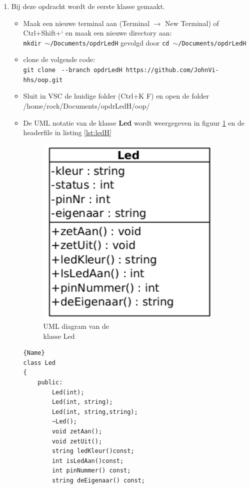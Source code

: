 \begin{enumerate}
\item Bij deze opdracht wordt de eerste klasse gemaakt.
\begin{itemize}
	\item Maak een nieuwe terminal aan (Terminal $\rightarrow$ New Terminal) of Ctrl+Shift+` en maak een nieuwe directory aan:\\ \texttt{mkdir $\sim$/Documents/opdrLedH} gevolgd door \texttt{cd $\sim$/Documents/opdrLedH}
	\item clone de volgende code:\\
	 {\small \texttt{git clone } \verb|--|\texttt{branch opdrLedH https://github.com/JohnVi-hhs/oop.git}}
	 \item Sluit in VSC de huidige folder (Ctrl+K F) en open de folder\\ /home/rock/Documents/opdrLedH/oop/ 
	\item De UML notatie van de klasse \textbf{Led} wordt weergegeven in figuur \ref{fig:klassLed} en de headerfile in listing \ref{lst:ledH}

	\begin{minipage}{0.5\textwidth} 
	\begin{figure}[H]
		\includegraphics[width=0.9\textwidth]{figuren/klasseLedOpg1}
		\caption{UML diagram van de \\klasse Led}
		\label{fig:klassLed}   
	\end{figure}
\end{minipage}\hfill
\begin{minipage}{.45\textwidth}
	\begin{lstlisting}[caption=LED declaratie file(.h),frame=tlrb,label={lst:ledH}]{Name}
class Led
{
	public:
    	Led(int);
		Led(int, string);
		Led(int, string,string);
		~Led();
		void zetAan();
		void zetUit();
		string ledKleur()const;
		int isLedAan()const;
		int pinNummer() const;
		string deEigenaar() const;
			

\end{lstlisting}
\end{minipage}
\end{itemize}
\end{enumerate}
